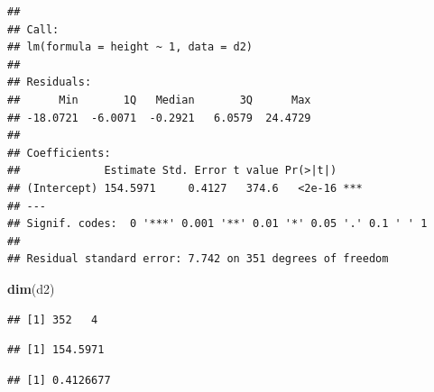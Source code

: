 \documentclass[
]{book}
\newenvironment{Shaded}{\begin{snugshade}}{\end{snugshade}}
\newcommand{\CommentTok}[1]{\textcolor[rgb]{0.56,0.35,0.01}{\textit{#1}}}
\newcommand{\FunctionTok}[1]{\textcolor[rgb]{0.13,0.29,0.53}{\textbf{#1}}}
\newcommand{\NormalTok}[1]{#1}
\newcommand{\SpecialCharTok}[1]{\textcolor[rgb]{0.81,0.36,0.00}{\textbf{#1}}}
\begin{document}
\begin{verbatim}
## 
## Call:
## lm(formula = height ~ 1, data = d2)
## 
## Residuals:
##      Min       1Q   Median       3Q      Max 
## -18.0721  -6.0071  -0.2921   6.0579  24.4729 
## 
## Coefficients:
##             Estimate Std. Error t value Pr(>|t|)    
## (Intercept) 154.5971     0.4127   374.6   <2e-16 ***
## ---
## Signif. codes:  0 '***' 0.001 '**' 0.01 '*' 0.05 '.' 0.1 ' ' 1
## 
## Residual standard error: 7.742 on 351 degrees of freedom
\end{verbatim}

\begin{Shaded}
\begin{Highlighting}[]
\FunctionTok{dim}\NormalTok{(d2)}
\end{Highlighting}
\end{Shaded}

\begin{verbatim}
## [1] 352   4
\end{verbatim}

\begin{Shaded}
\end{Shaded}

\begin{verbatim}
## [1] 154.5971
\end{verbatim}

\begin{Shaded}
\end{Shaded}

\begin{verbatim}
## [1] 0.4126677
\end{verbatim}

\begin{Shaded}
\end{Shaded}
\end{document}
